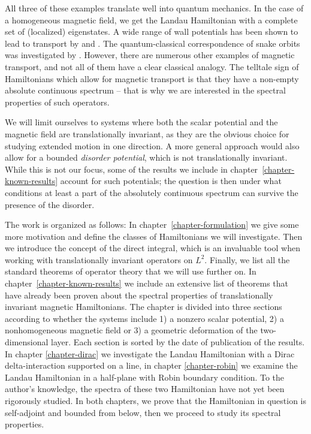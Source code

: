 All three of these examples translate well into quantum mechanics. In the case of a homogeneous magnetic field, we get the Landau Hamiltonian with a complete set of (localized) eigenstates. A wide range of wall potentials has been shown to lead to transport by \citet{Macris1999} and \citet{Frohlich2000}. The quantum-classical correspondence of snake orbits was investigated by \citet{Reijniers2000}. However, there are numerous other examples of magnetic transport, and not all of them have a clear classical analogy. The telltale sign of Hamiltonians which allow for magnetic transport is that they have a non-empty absolute continuous spectrum – that is why we are interested in the spectral properties of such operators.

We will limit ourselves to systems where both the scalar potential and the magnetic field are translationally invariant, as they are the obvious choice for studying extended motion in one direction. A more general approach would also allow for a bounded \textit{disorder potential}, which is not translationally invariant. While this is not our focus, some of the results we include in chapter~\ref{chapter-known-results} account for such potentials; the question is then under what conditions at least a part of the absolutely continuous spectrum can survive the presence of the disorder.

The work is organized as follows: In chapter~\ref{chapter-formulation} we give some more motivation and define the classes of Hamiltonians we will investigate. Then we introduce the concept of the direct integral, which is an invaluable tool when working with translationally invariant operators on $L^2$. Finally, we list all the standard theorems of operator theory that we will use further on. In chapter~\ref{chapter-known-results} we include an extensive list of theorems that have already been proven about the spectral properties of translationally invariant magnetic Hamiltonians. The chapter is divided into three sections according to whether the systems include 1) a nonzero scalar potential, 2) a nonhomogeneous magnetic field or 3) a geometric deformation of the two-dimensional layer. Each section is sorted by the date of publication of the results. In chapter \ref{chapter-dirac} we investigate the Landau Hamiltonian with a Dirac delta-interaction supported on a line, in chapter \ref{chapter-robin} we examine the Landau Hamiltonian in a half-plane with Robin boundary condition. To the author's knowledge, the spectra of these two Hamiltonian have not yet been rigorously studied. In both chapters, we prove that the Hamiltonian in question is self-adjoint and bounded from below, then we proceed to study its spectral properties.
